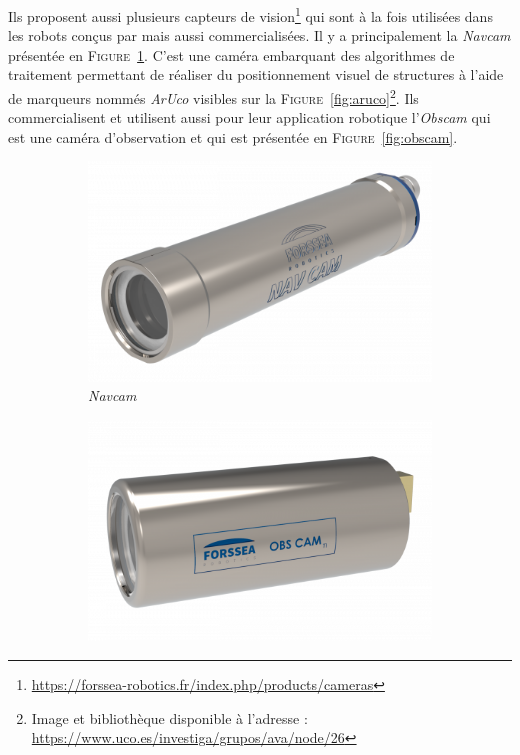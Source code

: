 			Ils proposent aussi plusieurs capteurs de vision\footnote{\url{https://forssea-robotics.fr/index.php/products/cameras}} qui sont à la fois utilisées dans les robots conçus par \forssea{} mais aussi commercialisées. Il y a principalement la \textit{Navcam} présentée en \textsc{Figure}~\ref{fig:navcam}. C'est une caméra embarquant des algorithmes de traitement permettant de réaliser du positionnement visuel de structures à l'aide de marqueurs nommés \textit{ArUco} visibles sur la \textsc{Figure}~\ref{fig:aruco}\footnote{Image et bibliothèque disponible à l'adresse : \url{https://www.uco.es/investiga/grupos/ava/node/26}}. Ils commercialisent et utilisent aussi pour leur application robotique l'\textit{Obscam} qui est une caméra d'observation et qui est présentée en \textsc{Figure}~\ref{fig:obscam}.

			\begin{figure}[!htb]
				\centering
				\begin{subfigure}[t]{0.33\textwidth}
					\centering
					\includegraphics[width=\textwidth]{imgs/navcam.png}
					\caption{\textit{Navcam}}
					\label{fig:navcam}
				\end{subfigure}
				\hfill
				\begin{subfigure}[t]{0.33\textwidth}
					\centering
					\includegraphics[width=\textwidth]{imgs/obscam.png}

\end{subfigure}
\end{figure}
